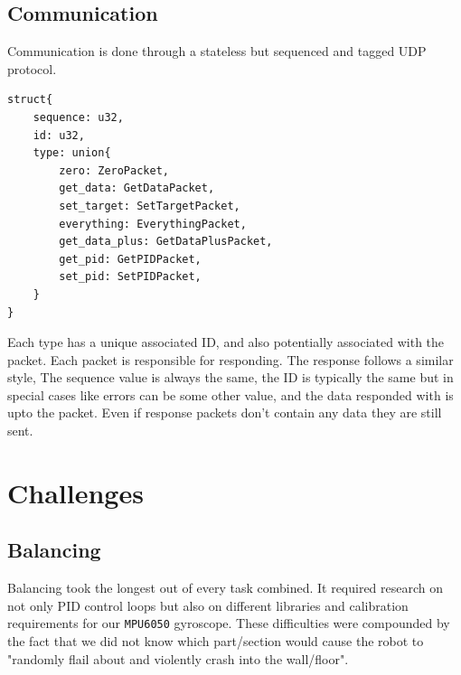 \documentclass[12pt]{article}
\begin{document}
\subsection{Communication}
Communication is done through a stateless but sequenced and tagged UDP protocol. 



\begin{lstlisting}[language=RustLike]
struct{
	sequence: u32,
	id: u32,
	type: union{
		zero: ZeroPacket,
		get_data: GetDataPacket,
		set_target: SetTargetPacket,
		everything: EverythingPacket,
		get_data_plus: GetDataPlusPacket,
		get_pid: GetPIDPacket,
		set_pid: SetPIDPacket,
	}
}
\end{lstlisting}

Each type has a unique associated ID, and also potentially associated with the packet. Each packet is responsible for responding. The response follows a similar style, The sequence value is always the same, the ID is typically the same but in special cases like errors can be some other value, and the data responded with is upto the packet. Even if response packets don't contain any data they are still sent.

\section{Challenges}

\subsection{Balancing}
Balancing took the longest out of every task combined. It required research on not only PID control loops but also on different libraries and calibration requirements for our \texttt{MPU6050} gyroscope. These difficulties were compounded by the fact that we did not know which part/section would cause the robot to "randomly flail about and violently crash into the wall/floor". 
\end{document}
